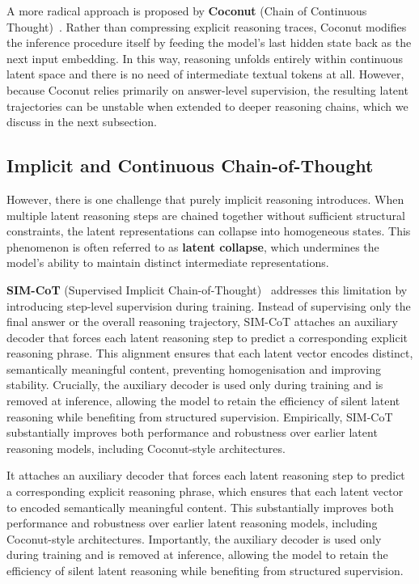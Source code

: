 \documentclass[12pt,twoside]{report}
\begin{document}
A more radical approach is proposed by \textbf{Coconut} (Chain of Continuous Thought)~\cite{hao2025traininglargelanguagemodels}. Rather than compressing explicit reasoning traces, Coconut modifies the inference procedure itself by feeding the model’s last hidden state back as the next input embedding. In this way, reasoning unfolds entirely within continuous latent space and there is no need of intermediate textual tokens at all. However, because Coconut relies primarily on answer-level supervision, the resulting latent trajectories can be unstable when extended to deeper reasoning chains, which we discuss in the next subsection.

\subsection{Implicit and Continuous Chain-of-Thought}

However, there is one challenge that purely implicit reasoning introduces. When multiple latent reasoning steps are chained together without sufficient structural constraints, the latent representations can collapse into homogeneous states. This phenomenon is often referred to as \textbf{latent collapse}, which undermines the model’s ability to maintain distinct intermediate representations.

\textbf{SIM-CoT} (Supervised Implicit Chain-of-Thought)~\cite{wei2025simcot} addresses this limitation by introducing step-level supervision during training. Instead of supervising only the final answer or the overall reasoning trajectory, SIM-CoT attaches an auxiliary decoder that forces each latent reasoning step to predict a corresponding explicit reasoning phrase. This alignment ensures that each latent vector encodes distinct, semantically meaningful content, preventing homogenisation and improving stability. Crucially, the auxiliary decoder is used only during training and is removed at inference, allowing the model to retain the efficiency of silent latent reasoning while benefiting from structured supervision. Empirically, SIM-CoT substantially improves both performance and robustness over earlier latent reasoning models, including Coconut-style architectures.

It attaches an auxiliary decoder that forces each latent reasoning step to predict a corresponding explicit reasoning phrase, which ensures that each latent vector to encoded semantically meaningful content. This substantially improves both performance and robustness over earlier latent reasoning models, including Coconut-style architectures. Importantly, the auxiliary decoder is used only during training and is removed at inference, allowing the model to retain the efficiency of silent latent reasoning while benefiting from structured supervision.
\end{document}

